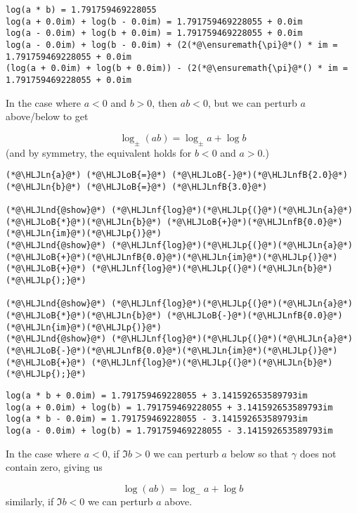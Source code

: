 \documentclass[12pt,a4paper]{article}
\newcommand{\HLJLn}[1]{#1}
\newcommand{\HLJLnd}[1]{\textcolor[RGB]{214,102,97}{#1}}
\newcommand{\HLJLnf}[1]{\textcolor[RGB]{66,102,213}{#1}}
\newcommand{\HLJLnfB}[1]{\textcolor[RGB]{59,151,46}{#1}}
\newcommand{\HLJLoB}[1]{\textcolor[RGB]{102,102,102}{\textbf{#1}}}
\newcommand{\HLJLp}[1]{#1}
\begin{document}
\begin{lstlisting}
log(a * b) = 1.791759469228055
log(a + 0.0im) + log(b - 0.0im) = 1.791759469228055 + 0.0im
log(a - 0.0im) + log(b + 0.0im) = 1.791759469228055 + 0.0im
log(a - 0.0im) + log(b - 0.0im) + (2(*@\ensuremath{\pi}@*() * im = 1.791759469228055 + 0.0im
(log(a + 0.0im) + log(b + 0.0im)) - (2(*@\ensuremath{\pi}@*() * im = 1.791759469228055 + 0.0im
\end{lstlisting}


In the case where $a < 0$ and $b > 0$, then $a b < 0$, but we can perturb $a$ above/below to get

\[
\log_\pm(a b) = \log_\pm a + \log b
\]
(and by symmetry, the equivalent holds for $b < 0$ and $a > 0$.)


\begin{lstlisting}
(*@\HLJLn{a}@*) (*@\HLJLoB{=}@*) (*@\HLJLoB{-}@*)(*@\HLJLnfB{2.0}@*)
(*@\HLJLn{b}@*) (*@\HLJLoB{=}@*) (*@\HLJLnfB{3.0}@*)

(*@\HLJLnd{@show}@*) (*@\HLJLnf{log}@*)(*@\HLJLp{(}@*)(*@\HLJLn{a}@*)(*@\HLJLoB{*}@*)(*@\HLJLn{b}@*) (*@\HLJLoB{+}@*)(*@\HLJLnfB{0.0}@*)(*@\HLJLn{im}@*)(*@\HLJLp{)}@*)
(*@\HLJLnd{@show}@*) (*@\HLJLnf{log}@*)(*@\HLJLp{(}@*)(*@\HLJLn{a}@*)(*@\HLJLoB{+}@*)(*@\HLJLnfB{0.0}@*)(*@\HLJLn{im}@*)(*@\HLJLp{)}@*) (*@\HLJLoB{+}@*) (*@\HLJLnf{log}@*)(*@\HLJLp{(}@*)(*@\HLJLn{b}@*)(*@\HLJLp{);}@*)

(*@\HLJLnd{@show}@*) (*@\HLJLnf{log}@*)(*@\HLJLp{(}@*)(*@\HLJLn{a}@*)(*@\HLJLoB{*}@*)(*@\HLJLn{b}@*) (*@\HLJLoB{-}@*)(*@\HLJLnfB{0.0}@*)(*@\HLJLn{im}@*)(*@\HLJLp{)}@*)
(*@\HLJLnd{@show}@*) (*@\HLJLnf{log}@*)(*@\HLJLp{(}@*)(*@\HLJLn{a}@*)(*@\HLJLoB{-}@*)(*@\HLJLnfB{0.0}@*)(*@\HLJLn{im}@*)(*@\HLJLp{)}@*) (*@\HLJLoB{+}@*) (*@\HLJLnf{log}@*)(*@\HLJLp{(}@*)(*@\HLJLn{b}@*)(*@\HLJLp{);}@*)
\end{lstlisting}

\begin{lstlisting}
log(a * b + 0.0im) = 1.791759469228055 + 3.141592653589793im
log(a + 0.0im) + log(b) = 1.791759469228055 + 3.141592653589793im
log(a * b - 0.0im) = 1.791759469228055 - 3.141592653589793im
log(a - 0.0im) + log(b) = 1.791759469228055 - 3.141592653589793im
\end{lstlisting}


In the case where $a < 0$, if $\Im b > 0$ we can perturb $a$ below so that $\gamma$ does not contain zero, giving us

\[
\log(ab) = \log_- a + \log b
\]
similarly, if $\Im b < 0$ we can perturb $a$ above.
\end{document}
